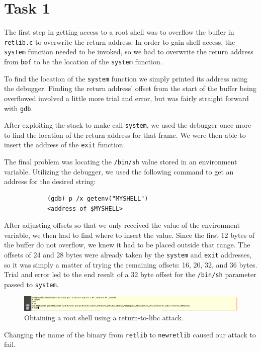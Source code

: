 \documentclass[12pt,letterpaper]{article}
\author{Chathan Driehuys}
\begin{document}
	\section*{Task 1}
		The first step in getting access to a root shell was to overflow the buffer in \texttt{retlib.c} to overwrite the return address. In order to gain shell access, the \texttt{system} function needed to be invoked, so we had to overwrite the return address from \texttt{bof} to be the location of the \texttt{system} function.
		
		To find the location of the \texttt{system} function we simply printed its address using the debugger. Finding the return address' offset from the start of the buffer being overflowed involved a little more trial and error, but was fairly straight forward with \texttt{gdb}.
		
		After exploiting the stack to make call \texttt{system}, we used the debugger once more to find the location of the return address for that frame. We were then able to insert the address of the \texttt{exit} function.
		
		The final problem was locating the \texttt{/bin/sh} value stored in an environment variable. Utilizing the debugger, we used the following command to get an address for the desired string:
		
		\begin{verbatim}
			(gdb) p /x getenv("MYSHELL")
			<address of $MYSHELL>
		\end{verbatim}
		
		After adjusting offsets so that we only received the value of the environment variable, we then had to find where to insert the value. Since the first 12 bytes of the buffer do not overflow, we knew it had to be placed outside that range. The offsets of 24 and 28 bytes were already taken by the \texttt{system} and \texttt{exit} addresses, so it was simply a matter of trying the remaining offsets: 16, 20, 32, and 36 bytes. Trial and error led to the end result of a 32 byte offset for the \texttt{/bin/sh} parameter passed to \texttt{system}.
		
		\begin{figure}[h]
			\includegraphics[width=\linewidth]{task-1}
			\caption{Obtaining a root shell using a return-to-libc attack.}
		\end{figure}
		
		Changing the name of the binary from \texttt{retlib} to \texttt{newretlib} caused our attack to fail.
		
\end{document}

